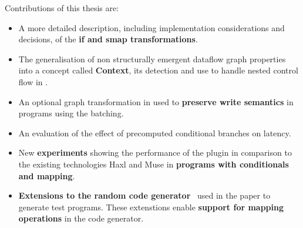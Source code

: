 Contributions of this thesis are:
\begin{itemize}
    \item A more detailed description, including implementation considerations and decisions, of the \textbf{if and smap transformations}.
    \item The generalisation of non structurally emergent dataflow graph properties into a concept called \textbf{Context}, its detection and use to handle nested control flow in \yauhau{}.
    \item An optional graph transformation in \yauhau{} used to \textbf{preserve write semantics} in programs using the \yauhau{} batching.
    \item An evaluation of the effect of precomputed conditional branches on latency.
    \item New \textbf{experiments} showing the performance of the \yauhau{} plugin in comparison to the existing technologies Haxl and Muse in \textbf{programs with conditionals and mapping}.
    \item \textbf{Extensions to the random code generator}~\cite{Goens-rand-code-graph} used in the \yauhau{} paper to generate test programs.
    These extenstions enable \textbf{support for mapping operations} in the code generator.
\end{itemize}

